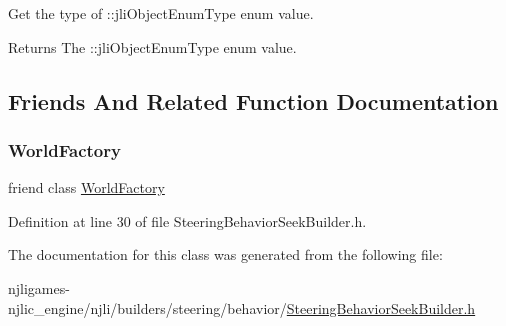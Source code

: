 Get the type of \+::jli\+Object\+Enum\+Type enum value.

\begin{DoxyReturn}{Returns}
The \+::jli\+Object\+Enum\+Type enum value. 
\end{DoxyReturn}


\subsection{Friends And Related Function Documentation}
\mbox{\label{classnjli_1_1_steering_behavior_seek_builder_acb96ebb09abe8f2a37a915a842babfac}} 
\subsubsection{\texorpdfstring{World\+Factory}{WorldFactory}}
{\footnotesize\ttfamily friend class \mbox{\hyperlink{classnjli_1_1_world_factory}{World\+Factory}}\hspace{0.3cm}{\ttfamily [friend]}}



Definition at line 30 of file Steering\+Behavior\+Seek\+Builder.\+h.



The documentation for this class was generated from the following file\+:\begin{DoxyCompactItemize}
\item 
njligames-\/njlic\+\_\+engine/njli/builders/steering/behavior/\mbox{\hyperlink{_steering_behavior_seek_builder_8h}{Steering\+Behavior\+Seek\+Builder.\+h}}\end{DoxyCompactItemize}
